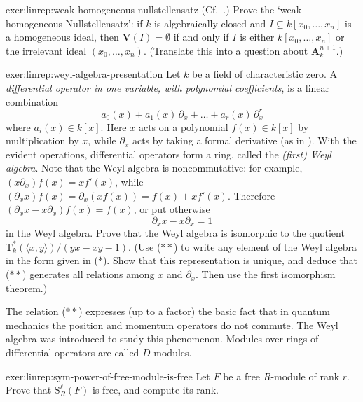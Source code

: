 \begin{exer}{}{exer:linrep:weak-homogeneous-nullstellensatz}
  (Cf.\
  .)
  Prove the `weak homogeneous Nullstellensatz': if $k$ is
  algebraically closed and $I \subseteq k[x_0, \dots, x_n]$ is a
  homogeneous ideal, then $\mathbf{V}(I) = \emptyset$ if and only if
  $I$ is either $k[x_0, \dots, x_n]$ or the irrelevant ideal
  $(x_0, \dots, x_n)$.  (Translate this into a question about
  $\mathbf{A}^{n+1}_k$.)
\end{exer}

\begin{exer}{}{exer:linrep:weyl-algebra-presentation}
  Let $k$ be a field of characteristic zero. A \emph{differential
    operator in one variable, with polynomial coefficients}, is a
  linear combination
  \begin{equation}
    \tag{$*$}
    a_0(x) + a_1(x)\,\partial_x + \dots + a_r(x)\,\partial_x^r
  \end{equation}
  where $a_i(x) \in k[x]$. Here $x$ acts on a polynomial
  $f(x) \in k[x]$ by multiplication by $x$, while $\partial_x$ acts by
  taking a formal derivative (as in
  ). With the evident
  operations, differential operators form a ring, called the
  \emph{(first) Weyl algebra}. Note that the Weyl algebra is
  noncommutative: for example, $(x\partial_x)f(x) = xf'(x)$, while
  $(\partial_x x)f(x) = \partial_x(xf(x)) = f(x) + xf'(x)$.  Therefore
  $(\partial_x x - x\partial_x)f(x) = f(x)$, or put otherwise
  \begin{equation}
    \tag{$**$}
    \partial_x x - x\partial_x = 1
  \end{equation}
  in the Weyl algebra. Prove that the Weyl algebra is isomorphic to
  the quotient $\mathrm{T}^*_k(\langle x, y \rangle)/(yx - xy -
  1)$. (Use ($**$) to write any element of the Weyl algebra in the
  form given in ($*$). Show that this representation is unique, and
  deduce that ($**$) generates all relations among $x$ and
  $\partial_x$. Then use the first isomorphism theorem.)

  The relation ($**$) expresses (up to a factor) the basic fact that
  in quantum mechanics the position and momentum operators do not
  commute.  The Weyl algebra was introduced to study this
  phenomenon. Modules over rings of differential operators are called
  $D$-modules.
\end{exer}
\begin{exer}{}{exer:linrep:sym-power-of-free-module-is-free}
  Let $F$ be a free $R$-module of rank $r$. Prove that
  $\mathrm{S}^\ell_R(F)$ is free, and compute its rank.
\end{exer}


